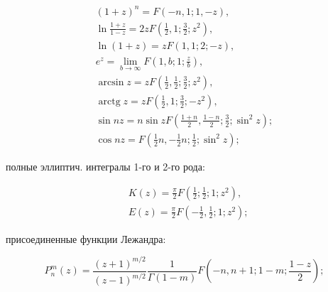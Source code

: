 \documentclass[10pt]{article}
\begin{document}
\[

\begin{gathered}

(1+z)^{n}=F(-n, 1 ; 1,-z), \\

\ln \frac{1+z}{1-z}=2 z F\left(\frac{1}{2}, 1 ; \frac{3}{2} ; z^{2}\right), \\

\ln (1+z)=z F(1,1 ; 2 ;-z), \\

e^{z}=\lim _{b \rightarrow \infty} F\left(1, b ; 1 ; \frac{z}{b}\right), \\

\arcsin z=z F\left(\frac{1}{2}, \frac{1}{2} ; \frac{3}{2} ; z^{2}\right), \\

\operatorname{arctg} z=z F\left(\frac{1}{2}, 1 ; \frac{3}{2} ;-z^{2}\right), \\

\sin n z=n \sin z F\left(\frac{1+n}{2}, \frac{1-n}{2} ; \frac{3}{2} ; \sin ^{2} z\right) ; \\

\cos n z=F\left(\frac{1}{2} n,-\frac{1}{2} n ; \frac{1}{2} ; \sin ^{2} z\right) ;

\end{gathered}

\]



полные эллиптич. интегралы 1-го и 2-го рода:



\[

\begin{aligned}

& K(z)=\frac{\pi}{2} F\left(\frac{1}{2} ; \frac{1}{2} ; 1 ; z^{2}\right), \\

& E(z)=\frac{\pi}{2} F\left(-\frac{1}{2}, \frac{1}{2} ; 1 ; z^{2}\right) ;

\end{aligned}

\]



присоединенные функции Лежандра:



\[

P_{n}^{m}(z)=\frac{(z+1)^{m / 2}}{(z-1)^{m / 2}} \frac{1}{\Gamma(1-m)} F\left(-n, n+1 ; 1-m ; \frac{1-z}{2}\right) ;

\]
\end{document}
